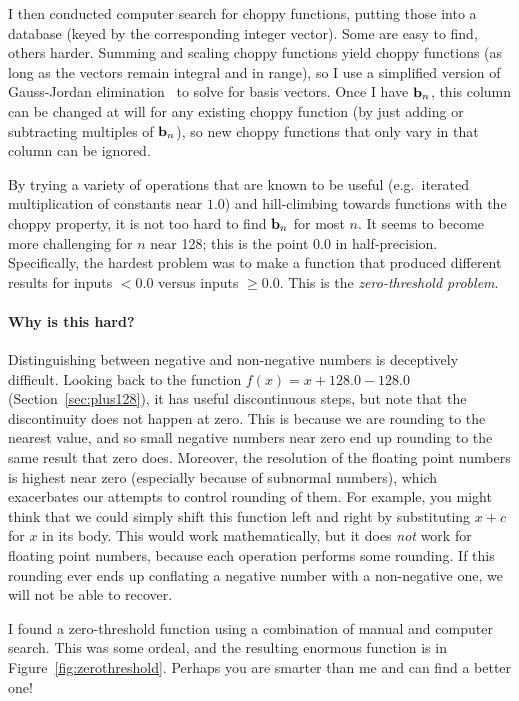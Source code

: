 \documentclass[twocolumn]{article}
\newcommand\basis{\ensuremath{\textrm{\bf b}}}
\begin{document}
I then conducted computer search for choppy functions, putting those
into a database (keyed by the corresponding integer vector). Some are
easy to find, others harder. Summing and scaling choppy functions
yield choppy functions (as long as the vectors remain integral and in
range), so I use a simplified version of Gauss-Jordan
elimination~\cite{gaussjordan} to solve for basis vectors. Once I have
$\basis_n$, this column can be changed at will for any existing choppy
function (by just adding or subtracting multiples of $\basis_n$), so
new choppy functions that only vary in that column can be ignored.

By trying a variety of operations that are known to be useful
(e.g.~iterated multiplication of constants near $1.0$) and
hill-climbing towards functions with the choppy property, it is not
too hard to find $\basis_n$ for most $n$. It seems to become more
challenging for $n$ near 128; this is the point $0.0$ in
half-precision. Specifically, the hardest problem was to make a
function that produced different results for inputs $< 0.0$ versus
inputs $\geq 0.0$. This is the {\em zero-threshold problem}.


\paragraph{Why is this hard?}
Distinguishing between negative and non-negative numbers is
deceptively difficult. Looking back to the function $f(x) = x + 128.0
- 128.0$ (Section~\ref{sec:plus128}), it has useful discontinuous
steps, but note that the discontinuity does not happen at zero. This
is because we are rounding to the nearest value, and so small negative
numbers near zero end up rounding to the same result that zero does.
Moreover, the resolution of the floating point numbers is highest near
zero (especially because of subnormal numbers), which exacerbates our
attempts to control rounding of them. For example, you might think
that we could simply shift this function left and right by
substituting $x + c$ for $x$ in its body. This would work
mathematically, but it does {\em not} work for floating point numbers,
because each operation performs some rounding. If this rounding ever
ends up conflating a negative number with a non-negative one, we will
not be able to recover.

I found a zero-threshold function using a combination of manual and
computer search. This was some ordeal, and the resulting enormous
function is in Figure~\ref{fig:zerothreshold}. Perhaps you are
smarter than me and can find a better one!
\end{document}
